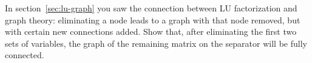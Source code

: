   In section~\ref{sec:lu-graph} you saw the connection between LU
  factorization and graph theory: eliminating a node leads to a graph
  with that node removed, but with certain new connections added.
  Show that, after eliminating the
  first two sets of variables, the graph of the remaining matrix on
  the separator will be fully connected.
